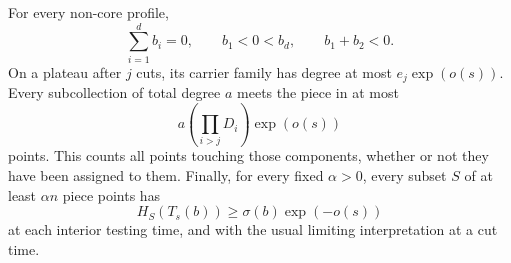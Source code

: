 \begin{proposition}\label{prop:prof-budget}
For every non-core profile,
\begin{equation}\label{eq:prof-balance}
 \sum_{i=1}^d b_i=0,\qquad b_1<0<b_d,\qquad b_1+b_2<0.
\end{equation}
On a plateau after $j$ cuts, its carrier family has degree at most $e_j\exp(o(s))$.  Every subcollection of total degree $a$ meets the piece in at most
\begin{equation}\label{eq:prof-mass-budget}
 a\left(\prod_{i>j}D_i\right)\exp(o(s))
\end{equation}
points.  This counts all points touching those components, whether or not they have been assigned to them.  Finally, for every fixed $\alpha>0$, every subset $S$ of at least $\alpha n$ piece points has
\begin{equation}\label{eq:prof-rank-budget}
 H_S(T_s(b))\ge\sigma(b)\exp(-o(s))
\end{equation}
at each interior testing time, and with the usual limiting interpretation at a cut time.
\end{proposition}

